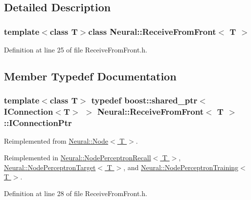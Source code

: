 \subsection{Detailed Description}
\subsubsection*{template$<$class T$>$class Neural::ReceiveFromFront$<$ T $>$}



Definition at line 25 of file ReceiveFromFront.h.



\subsection{Member Typedef Documentation}
\hypertarget{class_neural_1_1_receive_from_front_abf496040ce9745e7e1fc8274f9492295}{
\subsubsection[{IConnectionPtr}]{\setlength{\rightskip}{0pt plus 5cm}template$<$class T$>$ typedef boost::shared\_\-ptr$<$ {\bf IConnection}$<$T$>$ $>$ {\bf Neural::ReceiveFromFront}$<$ T $>$::{\bf IConnectionPtr}}}
\label{class_neural_1_1_receive_from_front_abf496040ce9745e7e1fc8274f9492295}


Reimplemented from \hyperlink{class_neural_1_1_node_ac797b836161befa12cd9897926139c14}{Neural::Node$<$ T $>$}.



Reimplemented in \hyperlink{class_neural_1_1_node_perceptron_recall_a3810ccef790454bbb05dcb86a1743d30}{Neural::NodePerceptronRecall$<$ T $>$}, \hyperlink{class_neural_1_1_node_perceptron_target_abdb5cb819de661fc83edb4eceb81f7e8}{Neural::NodePerceptronTarget$<$ T $>$}, and \hyperlink{class_neural_1_1_node_perceptron_training_acf502a8079c8e875773ac940986af738}{Neural::NodePerceptronTraining$<$ T $>$}.



Definition at line 28 of file ReceiveFromFront.h.



